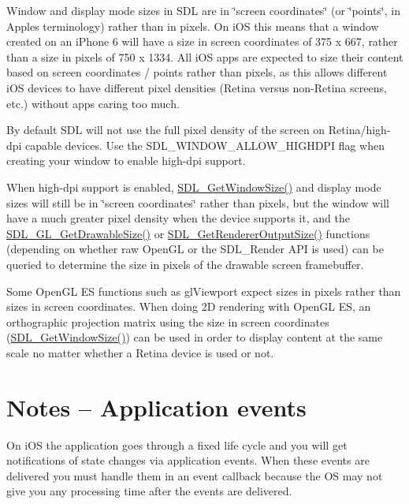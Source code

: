 Window and display mode sizes in S\+DL are in \char`\"{}screen coordinates\char`\"{} (or \char`\"{}points\char`\"{}, in Apple\textquotesingle{}s terminology) rather than in pixels. On i\+OS this means that a window created on an i\+Phone 6 will have a size in screen coordinates of 375 x 667, rather than a size in pixels of 750 x 1334. All i\+OS apps are expected to size their content based on screen coordinates / points rather than pixels, as this allows different i\+OS devices to have different pixel densities (Retina versus non-\/\+Retina screens, etc.) without apps caring too much.

By default S\+DL will not use the full pixel density of the screen on Retina/high-\/dpi capable devices. Use the S\+D\+L\+\_\+\+W\+I\+N\+D\+O\+W\+\_\+\+A\+L\+L\+O\+W\+\_\+\+H\+I\+G\+H\+D\+PI flag when creating your window to enable high-\/dpi support.

When high-\/dpi support is enabled, \mbox{\hyperlink{_s_d_l__video_8h_a5cbfffcfec91c22a7ca95fd1d5163db5}{S\+D\+L\+\_\+\+Get\+Window\+Size()}} and display mode sizes will still be in \char`\"{}screen coordinates\char`\"{} rather than pixels, but the window will have a much greater pixel density when the device supports it, and the \mbox{\hyperlink{_s_d_l__video_8h_ac21851bbd91760c5bab92594a58edba3}{S\+D\+L\+\_\+\+G\+L\+\_\+\+Get\+Drawable\+Size()}} or \mbox{\hyperlink{_s_d_l__render_8h_abfc0c9a50d9d1870ab7d271b7a73d8ab}{S\+D\+L\+\_\+\+Get\+Renderer\+Output\+Size()}} functions (depending on whether raw Open\+GL or the S\+D\+L\+\_\+\+Render A\+PI is used) can be queried to determine the size in pixels of the drawable screen framebuffer.

Some Open\+GL ES functions such as gl\+Viewport expect sizes in pixels rather than sizes in screen coordinates. When doing 2D rendering with Open\+GL ES, an orthographic projection matrix using the size in screen coordinates (\mbox{\hyperlink{_s_d_l__video_8h_a5cbfffcfec91c22a7ca95fd1d5163db5}{S\+D\+L\+\_\+\+Get\+Window\+Size()}}) can be used in order to display content at the same scale no matter whether a Retina device is used or not. 

 \section*{Notes -- Application events }

On i\+OS the application goes through a fixed life cycle and you will get notifications of state changes via application events. When these events are delivered you must handle them in an event callback because the OS may not give you any processing time after the events are delivered.

